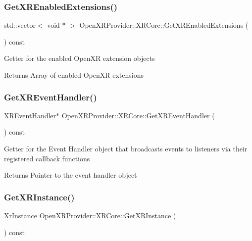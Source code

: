 \subsubsection{\texorpdfstring{GetXREnabledExtensions()}{GetXREnabledExtensions()}}
{\footnotesize\ttfamily std\+::vector$<$ void $\ast$ $>$ Open\+X\+R\+Provider\+::\+X\+R\+Core\+::\+Get\+X\+R\+Enabled\+Extensions (\begin{DoxyParamCaption}{ }\end{DoxyParamCaption}) const\hspace{0.3cm}{\ttfamily [inline]}}

Getter for the enabled Open\+XR extension objects \begin{DoxyReturn}{Returns}
Array of enabled Open\+XR extensions 
\end{DoxyReturn}
\mbox{\label{class_open_x_r_provider_1_1_x_r_core_a6562155859246e94fdf753b31b7dee33}} 
\subsubsection{\texorpdfstring{GetXREventHandler()}{GetXREventHandler()}}
{\footnotesize\ttfamily \mbox{\hyperlink{class_open_x_r_provider_1_1_x_r_event_handler}{X\+R\+Event\+Handler}}$\ast$ Open\+X\+R\+Provider\+::\+X\+R\+Core\+::\+Get\+X\+R\+Event\+Handler (\begin{DoxyParamCaption}{ }\end{DoxyParamCaption}) const\hspace{0.3cm}{\ttfamily [inline]}}

Getter for the Event Handler object that broadcasts events to listeners via their registered callback functions \begin{DoxyReturn}{Returns}
Pointer to the event handler object 
\end{DoxyReturn}
\mbox{\label{class_open_x_r_provider_1_1_x_r_core_a0c0e4697dbacf9ec226d64de4b734efd}} 
\subsubsection{\texorpdfstring{GetXRInstance()}{GetXRInstance()}}
{\footnotesize\ttfamily Xr\+Instance Open\+X\+R\+Provider\+::\+X\+R\+Core\+::\+Get\+X\+R\+Instance (\begin{DoxyParamCaption}{ }\end{DoxyParamCaption}) const\hspace{0.3cm}{\ttfamily [inline]}}

